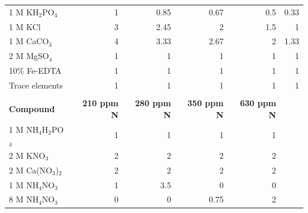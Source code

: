\begin{table}[!h]
{\begin{tabular}{p{2.805cm}p{2cm}p{2cm}p{2cm}p{2cm}p{2cm}}
        1 M KH$_2$PO$_4$        & \multicolumn{1}{r}{1}         & \multicolumn{1}{r}{0.85}      & \multicolumn{1}{r}{0.67}      & \multicolumn{1}{r}{0.5}       & \multicolumn{1}{r}{0.33} \\
        1 M KCl                 & \multicolumn{1}{r}{3}         & \multicolumn{1}{r}{2.45}      & \multicolumn{1}{r}{2}         & \multicolumn{1}{r}{1.5}       & \multicolumn{1}{r}{1} \\
        1 M CaCO$_3$            & \multicolumn{1}{r}{4}         & \multicolumn{1}{r}{3.33}      & \multicolumn{1}{r}{2.67}      & \multicolumn{1}{r}{2}         & \multicolumn{1}{r}{1.33} \\
        2 M MgSO$_4$            & \multicolumn{1}{r}{1}         & \multicolumn{1}{r}{1}         & \multicolumn{1}{r}{1}         & \multicolumn{1}{r}{1}         & \multicolumn{1}{r}{1} \\
        10\% Fe-EDTA            & \multicolumn{1}{r}{1}         & \multicolumn{1}{r}{1}         & \multicolumn{1}{r}{1}         & \multicolumn{1}{r}{1}         & \multicolumn{1}{r}{1} \\
        Trace elements          & \multicolumn{1}{r}{1}         & \multicolumn{1}{r}{1}         & \multicolumn{1}{r}{1}         & \multicolumn{1}{r}{1}         & \multicolumn{1}{r}{1} \\
        \hline
        &&&&&
        \\
        \hline
        \textbf{Compound}
        & \multicolumn{1}{r}{\textbf{210 ppm N}}
        & \multicolumn{1}{r}{\textbf{280 ppm N}}
        & \multicolumn{1}{r}{\textbf{350 ppm N}}
        & \multicolumn{1}{r}{\textbf{630 ppm N}} &
        \\
        \hline
        1 M NH$_4$H$_2$PO$_4$   & \multicolumn{1}{r}{1}         & \multicolumn{1}{r}{1}         & \multicolumn{1}{r}{1}         & \multicolumn{1}{r}{1}         &   \\
        2 M KNO$_3$             & \multicolumn{1}{r}{2}         & \multicolumn{1}{r}{2}         & \multicolumn{1}{r}{2}         & \multicolumn{1}{r}{2}         &   \\
        2 M Ca(NO$_3$)$_2$      & \multicolumn{1}{r}{2}         & \multicolumn{1}{r}{2}         & \multicolumn{1}{r}{2}         & \multicolumn{1}{r}{2}         &   \\
        1 M NH$_4$NO$_3$        & \multicolumn{1}{r}{1}         & \multicolumn{1}{r}{3.5}       & \multicolumn{1}{r}{0}         & \multicolumn{1}{r}{0}         &   \\
        8 M NH$_4$NO$_3$        & \multicolumn{1}{r}{0}         & \multicolumn{1}{r}{0}         & \multicolumn{1}{r}{0.75}      & \multicolumn{1}{r}{2}         &      \\

\end{tabular}}
\end{table}
